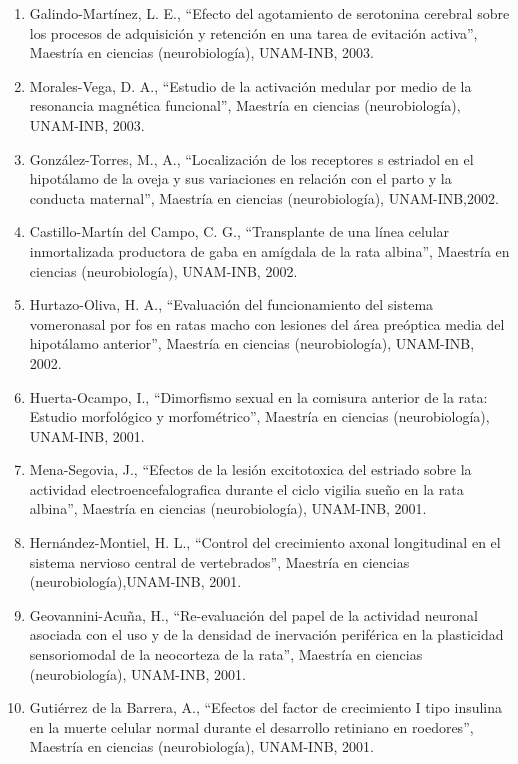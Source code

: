 \begin{enumerate}
\item Galindo-Martínez, L. E., “Efecto del agotamiento de serotonina cerebral sobre los procesos de adquisición y retención en una tarea de 
evitación activa”, Maestría en ciencias (neurobiología), UNAM-INB, 2003.

\item Morales-Vega, D. A., “Estudio de la activación medular por medio de la resonancia magnética funcional”, Maestría en ciencias 
(neurobiología), 
UNAM-INB, 2003.

\item González-Torres, M., A., “Localización de los receptores s estriadol en el hipotálamo de la oveja y sus variaciones en relación con el 
parto 
y la conducta maternal”, Maestría en ciencias (neurobiología), UNAM-INB,2002.

\item Castillo-Martín del Campo, C. G., “Transplante de una línea celular inmortalizada productora de gaba en amígdala de la rata albina”, 
Maestría 
en ciencias (neurobiología), UNAM-INB, 2002.

\item Hurtazo-Oliva, H. A., “Evaluación del funcionamiento del sistema vomeronasal por fos en ratas macho con lesiones del área preóptica 
media del 
hipotálamo anterior”, Maestría en ciencias (neurobiología), UNAM-INB, 2002.

\item Huerta-Ocampo, I., “Dimorfismo sexual en la comisura anterior de la rata: Estudio morfológico y morfométrico”, Maestría en ciencias 
(neurobiología), UNAM-INB, 2001.

\item Mena-Segovia, J., “Efectos de la lesión excitotoxica del estriado sobre la actividad electroencefalografica durante el ciclo vigilia 
sueño en 
la rata albina”, Maestría en ciencias (neurobiología), UNAM-INB, 2001.

\item Hernández-Montiel, H. L., “Control del crecimiento axonal longitudinal en el sistema nervioso central de vertebrados”, Maestría en 
ciencias 
(neurobiología),UNAM-INB, 2001.

\item Geovannini-Acuña, H., “Re-evaluación del papel de la actividad neuronal asociada con el uso y de la densidad de inervación periférica 
en la 
plasticidad sensoriomodal de la neocorteza de la rata”, Maestría en ciencias (neurobiología), UNAM-INB, 2001.

\item Gutiérrez de la Barrera, A., “Efectos del factor de crecimiento I tipo insulina en la muerte celular normal durante el desarrollo 
retiniano 
en roedores”, Maestría en ciencias (neurobiología), UNAM-INB, 2001.


\end{enumerate}
